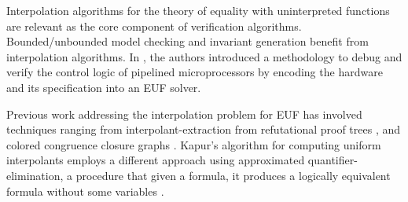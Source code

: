 Interpolation algorithms for the theory of equality 
with uninterpreted functions are relevant as the core 
component of verification algorithms. Bounded/unbounded 
model checking and invariant generation benefit from 
interpolation algorithms. In \cite{10.1007/3-540-58179-0_44}, 
the authors introduced a methodology to debug and verify 
the control logic of pipelined microprocessors by encoding 
the hardware and its specification
into an EUF solver.

Previous work addressing the interpolation problem for 
EUF has involved techniques ranging from
interpolant-extraction from refutational proof
trees \cite{10.1007/978-3-540-24730-2_2, mcmillan2011interpolants, 
10.1007/978-3-642-31612-8_24}, and colored congruence closure
graphs \cite{10.1007/978-3-642-00768-2_34}. Kapur's algorithm 
for computing uniform interpolants
employs a different approach using approximated
quantifier-elimination, a procedure that given a formula, 
it produces a logically equivalent formula without 
some variables \cite{DBLP:books/daglib/0076838}.

